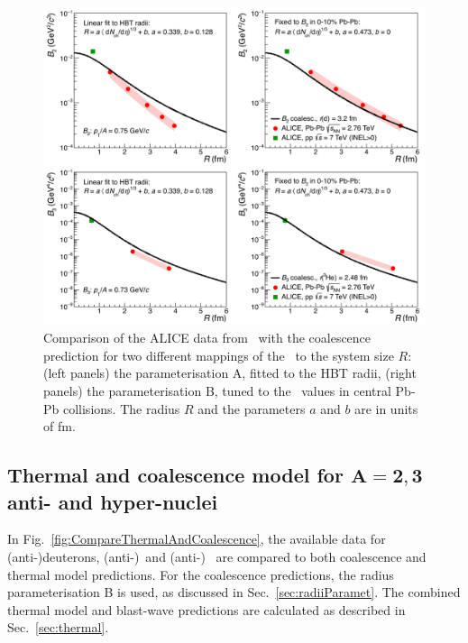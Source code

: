 \begin{figure}[htbp]
	\begin{center}
		\includegraphics[width=\textwidth]{../radiiParamCompareData.png}
		\caption{Comparison of the ALICE data from~\cite{ALICE:nucleipp2017, ALICE:deuteronppPbPb2015} with the coalescence prediction for two different mappings of the \avdNdeta~to the system size $R$: (left panels) the parameterisation A, fitted to the HBT radii, (right panels) the parameterisation B, tuned to the \btwo~values in central Pb-Pb collisions. The radius $R$ and the parameters $a$ and $b$ are in units of fm.}
		\label{fig:CompareB2B3forDifferentParamWithData}
	\end{center}
\end{figure}

\subsection{Thermal and coalescence model for $\mathbf{A = 2, 3}$ anti- and hyper-nuclei}
In Fig.~\ref{fig:CompareThermalAndCoalescence}, the available data for (anti-)deuterons, (anti-)\hethree\ and (anti-)\hthreelambda~\cite{Adam:2015yta} are compared to both coalescence and thermal model predictions. For the coalescence predictions, the radius parameterisation B is used, as discussed in Sec.~\ref{sec:radiiParamet}. The combined thermal model and blast-wave predictions are calculated as described in Sec.~\ref{sec:thermal}. 

